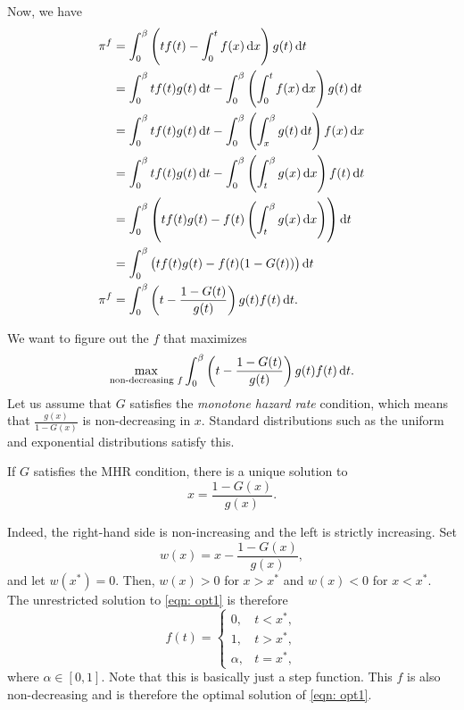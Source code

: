 		Now, we have
		\begin{align*}
			\pi^f &= \int_0^\beta \left( tf(t) - \int_0^t f(x) \dif x \right) g(t) \dif t \\
				&= \int_0^\beta tf(t)g(t) \dif t - \int_0^\beta \left(\int_0^t f(x) \dif x\right) g(t) \dif t \\
				&= \int_0^\beta tf(t)g(t) \dif t - \int_0^\beta \left(\int_x^\beta g(t) \dif t\right) f(x) \dif x \\
				&= \int_0^\beta tf(t)g(t) \dif t - \int_0^\beta \left(\int_t^\beta g(x) \dif x\right) f(t) \dif t \\
				&= \int_0^\beta \left(tf(t)g(t) - f(t)\left(\int_t^\beta g(x) \dif x\right)\right) \dif t \\
				&= \int_0^\beta \left(tf(t)g(t) - f(t)(1-G(t))\right) \dif t \\
			\pi^f &= \int_0^\beta \left( t - \frac{1-G(t)}{g(t)} \right) g(t)f(t) \dif t.
		\end{align*}
		
		We want to figure out the $f$ that maximizes
		\begin{equation}
			\label{eqn: opt1}
			\max_{\text{non-decreasing $f$}} \int_0^\beta \left( t - \frac{1-G(t)}{g(t)} \right)g(t)f(t) \dif t.
		\end{equation}
		Let us assume that $G$ satisfies the \emph{monotone hazard rate} condition, which means that $\frac{g(x)}{1-G(x)}$ is non-decreasing in $x$. Standard distributions such as the uniform and exponential distributions satisfy this.

		\begin{fact}
			If $G$ satisfies the MHR condition, there is a unique solution to
			\[ x = \frac{1-G(x)}{g(x)}. \]
		\end{fact}
		Indeed, the right-hand side is non-increasing and the left is strictly increasing. Set
		\[ w(x) = x - \frac{1-G(x)}{g(x)}, \]
		and let $w(x^*) = 0$. Then, $w(x) > 0$ for $x > x^*$ and $w(x) < 0$ for $x < x^*$. The unrestricted solution to \cref{eqn: opt1} is therefore
		\begin{equation}
			\label{eqn: optimal dist single agent}
			f(t) =
			\begin{cases}
				0, & t < x^*, \\
				1, & t > x^*, \\
				\alpha, & t = x^*,
			\end{cases}
		\end{equation}
		where $\alpha \in [0,1]$. Note that this is basically just a step function. This $f$ is also non-decreasing and is therefore the optimal solution of \cref{eqn: opt1}.

